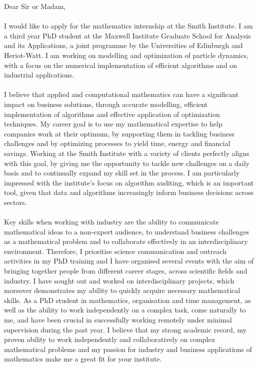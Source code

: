 \documentclass[11pt, letterpaper]{article}
\begin{document}
\justify
\vspace{0.4 cm}
Dear Sir or Madam,\\
\\
\noindent
I would like to apply for the mathematics internship at the Smith Institute. I am a third year PhD student at the Maxwell Institute Graduate School for Analysis and its Applications, a joint programme by the Universities of Edinburgh and Heriot-Watt. I am working on modelling and optimization of particle dynamics, with a focus on the numerical implementation of efficient algorithms and on industrial applications.\\
\\
\noindent
I believe that applied and computational mathematics can have a significant impact on business solutions, through accurate modelling, efficient implementation of algorithms and effective application of optimization techniques. My career goal is to use my mathematical expertise to help companies work at their optimum, by supporting them in tackling business challenges and by optimizing processes to yield time, energy and financial savings. Working at the Smith Institute with a variety of clients perfectly aligns with this goal, by giving me the opportunity to tackle new challenges on a daily basis and to continually expand my skill set in the process. I am particularly impressed with the institute's focus on algorithm auditing, which is an important tool, given that data and algorithms increasingly inform business decisions across sectors.
\\
\\
\noindent
Key skills when working with industry are the ability to communicate mathematical ideas to a non-expert audience, to understand business challenges as a mathematical problem and to collaborate effectively in an interdisciplinary environment. Therefore, I prioritise science communication and outreach activities in my PhD training and I have organised several events with the aim of bringing together people from different career stages, across scientific fields and industry. I have sought out and worked on interdisciplinary projects, which moreover demonstrates my ability to quickly acquire necessary mathematical skills. As a PhD student in mathematics, organisation and time management, as well as the ability to work independently on a complex task, come naturally to me, and have been crucial in successfully working remotely under minimal supervision during the past year.  
I believe that my strong academic record, my proven ability to work independently and collaboratively on complex mathematical problems and my passion for industry and business applications of mathematics make me a great fit for your institute.
\end{document}
